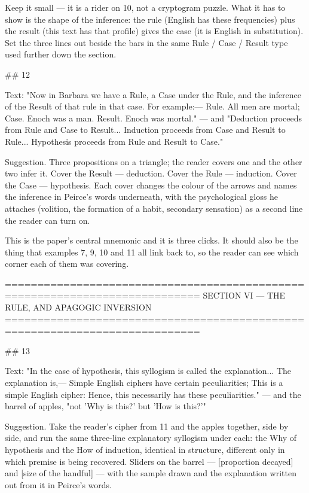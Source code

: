 Keep it small — it is a rider on 10, not a cryptogram puzzle. What it has to
show is the shape of the inference: the rule (English has these frequencies)
plus the result (this text has that profile) gives the case (it is English in
substitution). Set the three lines out beside the bars in the same Rule / Case /
Result type used further down the section.


## 12

Text: "Now in Barbara we have a Rule, a Case under the Rule, and the inference of
the Result of that rule in that case. For example:— Rule. All men are mortal;
Case. Enoch was a man. Result. Enoch was mortal." — and "Deduction proceeds from
Rule and Case to Result... Induction proceeds from Case and Result to Rule...
Hypothesis proceeds from Rule and Result to Case."

Suggestion. Three propositions on a triangle; the reader covers one and the
other two infer it. Cover the Result — deduction. Cover the Rule — induction.
Cover the Case — hypothesis. Each cover changes the colour of the arrows and
names the inference in Peirce's words underneath, with the psychological gloss
he attaches (volition, the formation of a habit, secondary sensation) as a
second line the reader can turn on.

This is the paper's central mnemonic and it is three clicks. It should also be
the thing that examples 7, 9, 10 and 11 all link back to, so the reader can see
which corner each of them was covering.


============================================================================
SECTION VI — THE RULE, AND APAGOGIC INVERSION
============================================================================

## 13

Text: "In the case of hypothesis, this syllogism is called the explanation...
The explanation is,— Simple English ciphers have certain peculiarities; This is
a simple English cipher: Hence, this necessarily has these peculiarities." —
and the barrel of apples, "not 'Why is this?' but 'How is this?'"

Suggestion. Take the reader's cipher from 11 and the apples together, side by
side, and run the same three-line explanatory syllogism under each: the Why of
hypothesis and the How of induction, identical in structure, different only in
which premise is being recovered. Sliders on the barrel — [proportion decayed]
and [size of the handful] — with the sample drawn and the explanation written
out from it in Peirce's words.

